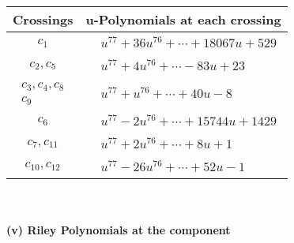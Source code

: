 \documentclass[1p]{elsarticle_modified}
\theoremstyle{definition}
\begin{document}
\begin{tabular}{m{50pt}|m{274pt}}
Crossings & \hspace{64pt}u-Polynomials at each crossing \\
\hline $$\begin{aligned}c_{1}\end{aligned}$$&$\begin{aligned}
&u^{77}+36 u^{76}+\cdots+18067 u+529
\end{aligned}$\\
\hline $$\begin{aligned}c_{2},c_{5}\end{aligned}$$&$\begin{aligned}
&u^{77}+4 u^{76}+\cdots-83 u+23
\end{aligned}$\\
\hline $$\begin{aligned}c_{3},c_{4},c_{8}\\c_{9}\end{aligned}$$&$\begin{aligned}
&u^{77}+u^{76}+\cdots+40 u-8
\end{aligned}$\\
\hline $$\begin{aligned}c_{6}\end{aligned}$$&$\begin{aligned}
&u^{77}-2 u^{76}+\cdots+15744 u+1429
\end{aligned}$\\
\hline $$\begin{aligned}c_{7},c_{11}\end{aligned}$$&$\begin{aligned}
&u^{77}+2 u^{76}+\cdots+8 u+1
\end{aligned}$\\
\hline $$\begin{aligned}c_{10},c_{12}\end{aligned}$$&$\begin{aligned}
&u^{77}-26 u^{76}+\cdots+52 u-1
\end{aligned}$\\
\hline
\end{tabular}\\~\\
\newpage\renewcommand{\arraystretch}{1}
\flushleft \textbf{(v) Riley Polynomials at the component}\newline \\
\end{document}

